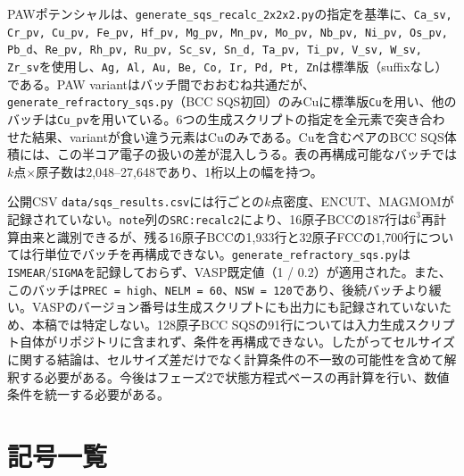 \documentclass[5p,10pt]{elsarticle}
\begin{document}
\begin{sloppypar}
PAWポテンシャルは、\texttt{generate\_sqs\_recalc\_2x2x2.py}の指定を基準に、\texttt{Ca\_sv, Cr\_pv, Cu\_pv, Fe\_pv, Hf\_pv, Mg\_pv, Mn\_pv, Mo\_pv, Nb\_pv, Ni\_pv, Os\_pv, Pb\_d}、\texttt{Re\_pv, Rh\_pv, Ru\_pv, Sc\_sv, Sn\_d, Ta\_pv, Ti\_pv, V\_sv, W\_sv, Zr\_sv}を使用し、\texttt{Ag, Al, Au, Be, Co, Ir, Pd, Pt, Zn}は標準版（suffixなし）である。PAW variantはバッチ間でおおむね共通だが、\texttt{generate\_refractory\_sqs.py}（BCC SQS初回）のみCuに標準版\texttt{Cu}を用い、他のバッチは\texttt{Cu\_pv}を用いている。6つの生成スクリプトの指定を全元素で突き合わせた結果、variantが食い違う元素はCuのみである。Cuを含むペアのBCC SQS体積には、この半コア電子の扱いの差が混入しうる。表の再構成可能なバッチでは$k$点$\times$原子数は2,048--27,648であり、1桁以上の幅を持つ。
\end{sloppypar}

公開CSV \texttt{data/sqs\_results.csv}には行ごとの$k$点密度、ENCUT、MAGMOMが記録されていない。\texttt{note}列の\texttt{SRC:recalc2}により、16原子BCCの187行は$6^3$再計算由来と識別できるが、残る16原子BCCの1,933行と32原子FCCの1,700行については行単位でバッチを再構成できない。\texttt{generate\_refractory\_sqs.py}は\texttt{ISMEAR}/\texttt{SIGMA}を記録しておらず、VASP既定値（1 / 0.2）が適用された。また、このバッチは\texttt{PREC = high}、\texttt{NELM = 60}、\texttt{NSW = 120}であり、後続バッチより緩い。VASPのバージョン番号は生成スクリプトにも出力にも記録されていないため、本稿では特定しない。128原子BCC SQSの91行については入力生成スクリプト自体がリポジトリに含まれず、条件を再構成できない。したがってセルサイズに関する結論は、セルサイズ差だけでなく計算条件の不一致の可能性を含めて解釈する必要がある。今後はフェーズ2で状態方程式ベースの再計算を行い、数値条件を統一する必要がある。


\section{記号一覧}
\label{sec:nomenclature}
\end{document}
